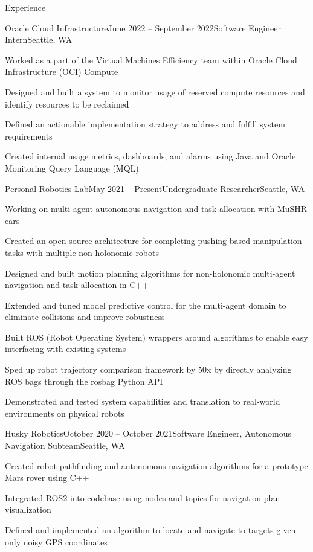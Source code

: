 \documentclass{resume} %
\begin{document}
\begin{rSection}{Experience}

\begin{rSubsection}{Oracle Cloud Infrastructure}{June 2022 – September 2022}{Software Engineer Intern}{Seattle, WA}
\item Worked as a part of the Virtual Machines Efficiency team within Oracle Cloud Infrastructure (OCI) Compute
\item Designed and built a system to monitor usage of reserved compute resources and identify resources to be reclaimed
\item Defined an actionable implementation strategy to address and fulfill system requirements
\item Created internal usage metrics, dashboards, and alarms using Java and Oracle Monitoring Query Language (MQL)
\end{rSubsection}

\begin{rSubsection}{Personal Robotics Lab}{May 2021 – Present}{Undergraduate Researcher}{Seattle, WA}
\item Working on multi-agent autonomous navigation and task allocation with \href{https://mushr.io}{MuSHR cars}
\item Created an open-source architecture for completing pushing-based manipulation tasks with multiple non-holonomic robots
\item Designed and built motion planning algorithms for non-holonomic multi-agent navigation and task allocation in C++
\item Extended and tuned model predictive control for the multi-agent domain to eliminate collisions and improve robustness
\item Built ROS (Robot Operating System) wrappers around algorithms to enable easy interfacing with existing systems
\item Sped up robot trajectory comparison framework by 50x by directly analyzing ROS bags through the rosbag Python API
\item Demonstrated and tested system capabilities and translation to real-world environments on physical robots
\end{rSubsection}

\begin{rSubsection}{Husky Robotics}{October 2020 – October 2021}{Software Engineer, Autonomous Navigation Subteam}{Seattle, WA}
\item Created robot pathfinding and autonomous navigation algorithms for a prototype Mars rover using C++
\item Integrated ROS2 into codebase using nodes and topics for navigation plan visualization
\item Defined and implemented an algorithm to locate and navigate to targets given only noisy GPS coordinates
\end{rSubsection}

\end{rSection}
\end{document}
